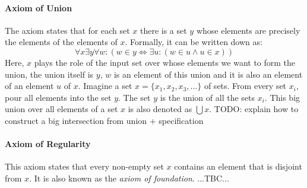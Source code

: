 


\paragraph{Axiom of Union}
The axiom states that for each set $x$ there is a set $y$ whose elements are precisely the elements of the elements of $x$. Formally, it can be written down as:
\begin{equation}
\forall x \exists y \forall w:
(w \in y \Leftrightarrow \exists u:(w \in u \wedge u \in x )  )
\end{equation}
Here, $x$ plays the role of the input set over whose elements we want to form the union, the union itself is $y$, $w$ is an element of this union and it is also an element of an element $u$ of $x$. Imagine a set $x = \{ x_1, x_2, x_3, \ldots \} $ of sets. From every set $x_i$, pour all elements into the set $y$. The set $y$ is the union of all the sets $x_i$. This big union over all elements of a set $x$ is also denoted as $\bigcup x$. TODO: explain how to construct a big intersection from union + specification


\paragraph{Axiom of Regularity}
This axiom states that every non-empty set $x$ contains an element that is disjoint from $x$. It is also known as the \emph{axiom of foundation}. ...TBC...




